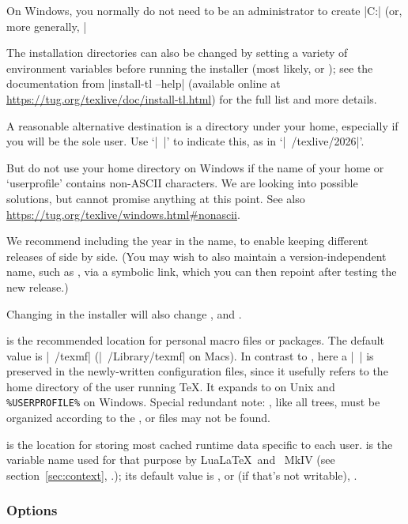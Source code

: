 \documentclass[12pt]{article}
\begin{document}
On Windows, you normally do not need to be an administrator to
create |C:\texlive{}| (or, more generally,
|%

The installation directories can also be changed by setting a variety of
environment variables before running the installer (most likely,
 or
); see the documentation from
|install-tl --help| (available online at
\url{https://tug.org/texlive/doc/install-tl.html}) for the full list and
more details.

A reasonable alternative destination is a directory under your home,
especially if you will be the sole user. Use `|~|' to indicate this, as
in `|~/texlive/2026|'.

But do not use your home directory on Windows if the name of your home
or `userprofile' contains non-ASCII characters. We are looking into
possible solutions, but cannot promise anything at this point. See also
\url{https://tug.org/texlive/windows.html\#nonascii}.

We recommend including the year in the name, to enable keeping different
releases of \TL{} side by side.  (You may wish to also maintain a
version-independent name, such as , via a
symbolic link, which you can then repoint after testing the new release.)

Changing  in the installer will also change
,  and
.

 is the recommended location for personal macro files
or packages.  The default value is |~/texmf| (|~/Library/texmf| on
Macs).  In contrast to , here a |~| is preserved in the
newly-written configuration files, since it usefully refers to the home
directory of the user running \TeX.  It expands to  on
Unix and \verb|%USERPROFILE%| on Windows.  Special redundant note:
, like all trees, must be organized according to the
\TDS, or files may not be found.

 is the location for storing most cached runtime data
specific to each user.   is the variable name used
for that purpose by Lua\LaTeX\ and \ConTeXt\ MkIV (see
section~\ref{sec:context}, \p.\pageref{sec:context}); its
default value is , or (if that's not writable),
.


\subsubsection{Options}
\label{sec:options}
\end{document}
